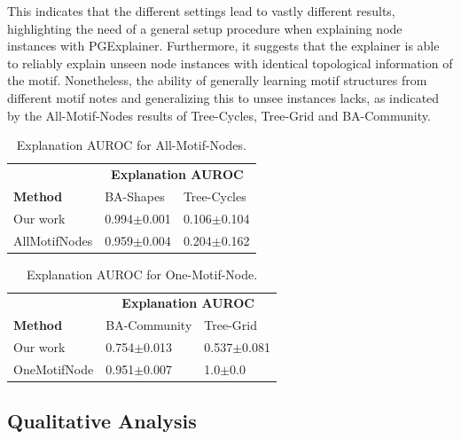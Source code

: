 This indicates that the different settings lead to vastly different results, highlighting the need of a general setup procedure when explaining node instances with PGExplainer. Furthermore, it suggests that the explainer is able to reliably explain unseen node instances with identical topological information of the motif. Nonetheless, the ability of generally learning motif structures from different motif notes and generalizing this to unsee instances lacks, as indicated by the All-Motif-Nodes results of Tree-Cycles, Tree-Grid and BA-Community.

\begin{table}[ht]
    \centering
    \scriptsize
    \begin{tabularx}{0.6\textwidth}{l*{2}{X}}   %
    \toprule
    \textbf{} & \multicolumn{2}{c}{\textbf{Explanation AUROC}} \\
    \cmidrule{2-3}
    \textbf{Method} & BA-Shapes & Tree-Cycles \\
    \midrule
    Our work & 0.994$\pm$0.001 & 0.106$\pm$0.104 \\
    \midrule
    AllMotifNodes & 0.959$\pm$0.004 & 0.204$\pm$0.162 \\
    \bottomrule
    \end{tabularx}
    \caption[Inductive performance using all motif nodes for training]{Explanation AUROC for All-Motif-Nodes.}
    \label{tab:allmotifnodes_selected}
\end{table}

\begin{table}[ht]
    \centering
    \scriptsize
    \begin{tabularx}{0.6\textwidth}{l*{2}{X}}   %
    \toprule
    \textbf{} & \multicolumn{2}{c}{\textbf{Explanation AUROC}} \\
    \cmidrule{2-3}
    \textbf{Method} & BA-Community & Tree-Grid \\
    \midrule
    Our work & 0.754$\pm$0.013 & 0.537$\pm$0.081 \\
    \midrule
    OneMotifNode & 0.951$\pm$0.007 & 1.0$\pm$0.0 \\
    \bottomrule
    \end{tabularx}
    \caption[Inductive performance using one motif node for training]{Explanation AUROC for One-Motif-Node.}
    \label{tab:onemotifnode_selected}
\end{table}


\subsection{Qualitative Analysis}
\label{sec:qual_exp}

